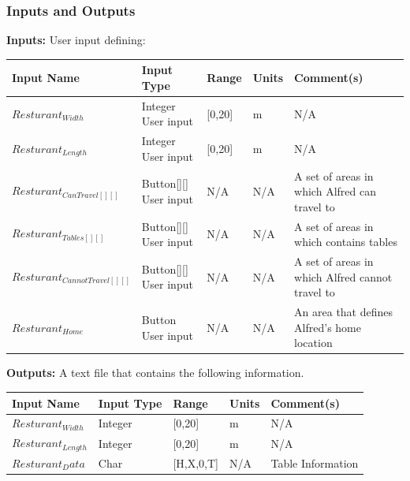 \documentclass [10pt]{article}
\begin{document}

\subsubsection{Inputs and Outputs}

\textbf{Inputs:} User input defining:\\

\begin{longtable}{|l|l|l|l|l|}\hline 
	\rowcolor{tableCell}\textbf{Input Name} & \textbf{Input Type} & \textbf{Range} & \textbf{Units} & \textbf{Comment(s)} \\ \hline
	$ Resturant_{Width} $ & Integer User input &  [0,20] & m &  N/A\\ \hline
	\rowcolor{tableCell}$ Resturant_{Length} $ & Integer User input &  [0,20] & m &  N/A\\ \hline
	$ Resturant_{CanTravel[][]} $ & Button[][] User input &  N/A & N/A & A set of areas in which Alfred can travel to \\ \hline
	\rowcolor{tableCell}$ Resturant_{Tables[][]} $ & Button[][] User input &  N/A & N/A & A set of areas in which contains tables \\ \hline
	$ Resturant_{CannotTravel[][]} $ & Button[][] User input &  N/A & N/A & A set of areas in which Alfred cannot travel to \\ \hline
	\rowcolor{tableCell}$ Resturant_{Home} $ & Button User input &  N/A & N/A & An area that defines Alfred's home location \\ \hline
\end{longtable}


\textbf{Outputs: }A text file that contains the following information. \\

\begin{longtable}{|l|l|l|l|l|}\hline 
	\rowcolor{tableCell}\textbf{Input Name} & \textbf{Input Type} & \textbf{Range} & \textbf{Units} & \textbf{Comment(s)} \\ \hline
	$ Resturant_{Width} $ & Integer &  [0,20] & m &  N/A\\ \hline
	\rowcolor{tableCell}$ Resturant_{Length} $ & Integer  &  [0,20] & m &  N/A\\ \hline
	$ Resturant_Data $& Char  &  [H,X,0,T] & N/A & Table Information \\ \hline
\end{longtable}
\end{document}
